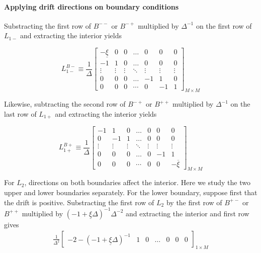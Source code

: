 \documentclass[11pt]{article}
\theoremstyle{definition}
\begin{document}
\paragraph{Applying drift directions on boundary conditions}
Substracting the first row of $B^{--}$ or $B^{-+}$ multiplied by $\Delta^{-1}$ on the first row of $L_{1-}$ and extracting the interior yields

\begin{equation}
L_{1-}^{B-} \equiv \frac{1}{\Delta}\begin{bmatrix}
-\underline{\xi} &0&0&\dots&0&0&0\\
-1&1&0&\dots&0&0&0\\
\vdots&\vdots&\vdots&\ddots&\vdots&\vdots&\vdots\\
0&0&0&\dots&-1&1&0\\
0&0&0&\cdots&0&-1&1
\end{bmatrix}_{M\times M} \label{eq:L-1-regular-left}
\end{equation}

Likewise, subtracting the second row of $B^{-+}$ or $B^{++}$ multiplied by $\Delta^{-1}$ on the last row of $L_{1+}$ and extracting the interior yields

\begin{equation}
L_{1+}^{B+} \equiv \frac{1}{\Delta}\begin{bmatrix}
-1 &1&0&\dots&0&0&0\\
0&-1&1&\dots&0&0&0\\
\vdots&\vdots&\vdots&\ddots&\vdots&\vdots&\vdots\\
0&0&0&\dots&0&-1&1\\
0&0&0&\cdots&0&0&-\overline{\xi} 
\end{bmatrix}_{M\times M} \label{eq:L-1p-regular-right}
\end{equation}

For $L_2$, directions on both boundaries affect the interior. Here we study the two upper and lower boundaries separately. For the lower boundary, suppose first that the drift is positive. Substracting the first row of $L_2$ by the first row of $B^{+-}$ or $B^{++}$ multiplied by $(-1 + \underline{\xi} \Delta )^{-1} \Delta^{-2}$ and extracting the interior and first row gives
\begin{align}
\frac{1}{\Delta^2}\begin{bmatrix}
-2 - (-1 + \underline{\xi}\Delta)^{-1} &1&0&\dots&0&0&0
\end{bmatrix}_{1\times M}
\end{align}
\end{document}
